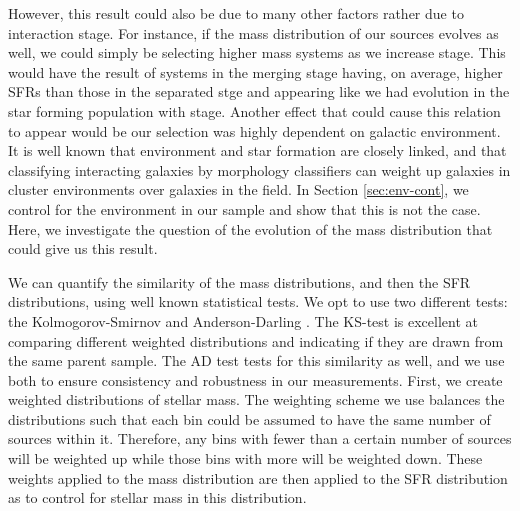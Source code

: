 However, this result could also be due to many other factors rather due to interaction stage. For instance, if the mass distribution of our sources evolves as well, we could simply be selecting higher mass systems as we increase stage. This would have the result of systems in the merging stage having, on average, higher SFRs than those in the separated stge and appearing like we had evolution in the star forming population with stage. Another effect that could cause this relation to appear would be our selection was highly dependent on galactic environment. It is well known that environment and star formation are closely linked, and that classifying interacting galaxies by morphology classifiers can weight up galaxies in cluster environments over galaxies in the field. In Section \ref{sec:env-cont}, we control for the environment in our sample and show that this is not the case. Here, we investigate the question of the evolution of the mass distribution that could give us this result.

We can quantify the similarity of the mass distributions, and then the SFR distributions, using well known statistical tests. We opt to use two different tests: the Kolmogorov-Smirnov \citep[KS-test;][]{an1933sulla} and Anderson-Darling \citep[AD-test;][]{stephens_74}. The KS-test is excellent at comparing different weighted distributions and indicating if they are drawn from the same parent sample. The AD test tests for this similarity as well, and we use both to ensure consistency and robustness in our measurements. First, we create weighted distributions of stellar mass. The weighting scheme we use balances the distributions such that each bin could be assumed to have the same number of sources within it. Therefore, any bins with fewer than a certain number of sources will be weighted up while those bins with more will be weighted down. These weights applied to the mass distribution are then applied to the SFR distribution as to control for stellar mass in this distribution.


